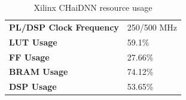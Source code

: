 \begin{table}[H]
	\caption{Xilinx CHaiDNN resource usage}
	\label{tab:CHaiDNN-resource-usage}
	\centering
	\begin{tabular}{ll}
		\toprule
		\textbf{PL/DSP Clock Frequency} & 250/500 MHz \\
		\textbf{LUT Usage}              & 59.1\%      \\
		\textbf{FF Usage}               & 27.66\%     \\
		\textbf{BRAM Usage}             & 74.12\%     \\
		\textbf{DSP Usage}              & 53.65\%     \\
		\bottomrule
	\end{tabular}
\end{table}



